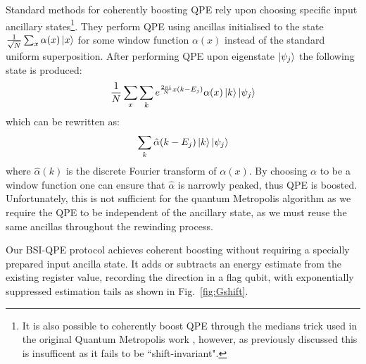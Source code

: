\documentclass[aps,floatfix,10pt,amssymb,amsfont,amsmath,superscriptaddress,float,nofootinbib,longbibliography,nobalancelastpage,twocolumn]{revtex4-2}
\begin{document}
Standard methods \cite{babbush2018encoding, rendon2022effects, berry2024analyzing, greenaway2024case, patel2026optimal} for coherently boosting QPE rely upon choosing specific input ancillary states\footnote{It is also possible to coherently boost QPE through the medians trick \cite{nagaj2009fast} used in the original Quantum Metropolis work \cite{Temme_2011}, however, as previously discussed this is insufficent as it fails to be ``shift-invariant".}. They perform QPE using ancillas initialised to the state $\frac{1}{\sqrt{N}}\sum_x \alpha(x) \ket{x}$ for some window function $\alpha(x)$ instead of the standard uniform superposition. After performing QPE upon eigenstate $\ket{\psi_j}$ the following state is produced:
\begin{equation}
   \frac{1}{N} \sum_x \sum_k e^{\frac{2 \pi i}{N}x(k-E_j)} \alpha(x)\ket{k}\ket{\psi_j}
\end{equation}
which can be rewritten as:
\begin{equation}
    \sum_k \hat\alpha(k-E_j) \ket{k}\ket{\psi_j}
\end{equation}
where $\hat \alpha(k)$ is the discrete Fourier transform of $\alpha(x)$. By choosing $\alpha$ to be a window function one can ensure that $\hat \alpha$ is narrowly peaked, thus QPE is boosted. Unfortunately, this is not sufficient for the quantum Metropolis algorithm as we require the QPE to be independent of the ancillary state, as we must reuse the same ancillas throughout the rewinding process. 

Our BSI-QPE protocol achieves coherent boosting without requiring a specially prepared input ancilla state. It adds or subtracts an energy estimate from the existing register value, recording the direction in a flag qubit, with exponentially suppressed estimation tails as shown in Fig.~\ref{fig:Gshift}.
\end{document}
